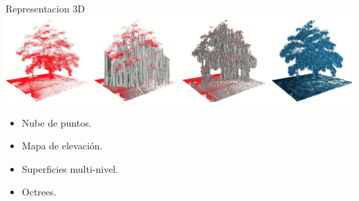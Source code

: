 \documentclass[
  24pt, %
  aspectratio=169, %
]{beamer}
\begin{document}
\begin{frame}{Representacion 3D}
  \bigskip %
 \centering
  \includegraphics[width=1\textwidth,height=0.35\textheight]{img4}\footnotemark
  \vspace{2pt}\\
  \bigskip %
  
  \begin{itemize}
  \item Nube de puntos.
  \item Mapa de elevación.
  \item Superficies multi-nivel.
  \item Octrees.
  \end{itemize}
  
\end{frame}
\end{document}
